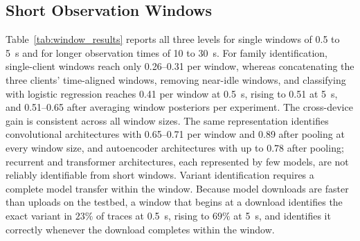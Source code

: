 \subsection{Short Observation Windows}
Table~\ref{tab:window_results} reports all three levels for single windows of
0.5 to 5~s and for longer observation times of 10 to 30~s. For family identification, single-client windows reach only 0.26--0.31 per
window, whereas concatenating the three clients' time-aligned windows, removing
near-idle windows, and classifying with logistic regression reaches 0.41 per
window at 0.5~s, rising to 0.51 at 5~s, and 0.51--0.65 after averaging window
posteriors per experiment. The cross-device gain is consistent across all window
sizes. The same representation identifies convolutional architectures with
0.65--0.71 per window and 0.89 after pooling at every window size, and
autoencoder architectures with up to 0.78 after pooling; recurrent and
transformer architectures, each represented by few models, are not reliably
identifiable from short windows. Variant identification requires a complete
model transfer within the window. Because model downloads are faster than
uploads on the testbed, a window that begins at a download identifies the exact
variant in $23\%$ of traces at 0.5~s, rising to $69\%$ at 5~s, and identifies
it correctly whenever the download completes within the window.

